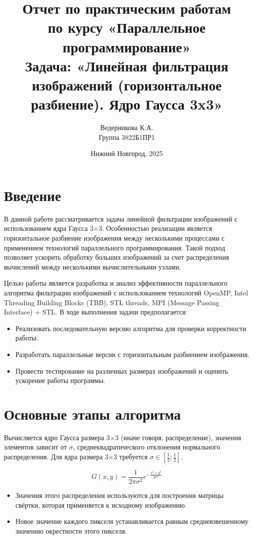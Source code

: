 \documentclass[a4paper,12pt]{article}
\title{Отчет по практическим работам \\ по курсу «Параллельное программирование» \\ Задача: «Линейная фильтрация изображений (горизонтальное разбиение). Ядро Гаусса 3x3»}
\author{Ведерникова К.А. \\ Группа 3822Б1ПР1}
\date{Нижний Новгород, 2025}
\begin{document}
\maketitle

\section*{Введение}
В данной работе рассматривается задача линейной фильтрации изображений с использованием ядра Гаусса 3×3. Особенностью реализации является горизонтальное разбиение изображения между несколькими процессами с применением технологий параллельного программирования. Такой подход позволяет ускорить обработку больших изображений за счет распределения вычислений между несколькими вычислительными узлами.

Целью работы является разработка и анализ эффективности параллельного алгоритма фильтрации изображений с использованием технологий OpenMP, Intel Threading Building Blocks (TBB), STL threads, MPI (Message Passing Interface) + STL. В ходе выполнения задачи предполагается:
\begin{itemize}
    \item Реализовать последовательную версию алгоритма для проверки корректности работы.
    \item Разработать параллельные версии с горизонтальным разбиением изображения.
    \item Провести тестирование на различных размерах изображений и оценить ускорение работы программы.
\end{itemize}

\section*{Основные этапы алгоритма}
Вычисляется ядро Гаусса размера 3×3 (иначе говоря, распределение), значения элементов зависит от $\sigma$, среднеквадратического отклонения нормального распределения. Для ядра размера 3×3 требуется $\sigma \in \left[\frac{1}{3}; \frac{1}{2}\right]$.

\begin{equation}
G(x,y) = \frac{1}{2\pi\sigma^{2}}e^{-\frac{x^{2} + y^{2}}{2\sigma^{2}}}
\end{equation}

\begin{itemize}
    \item Значения этого распределения используются для построения матрицы свёртки, которая применяется к исходному изображению.
    \item Новое значение каждого пикселя устанавливается равным средневзвешенному значению окрестности этого пикселя.
\end{itemize}
\end{document}
